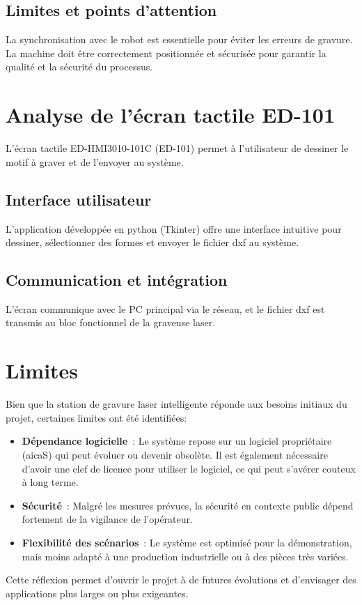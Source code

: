 \subsection{Limites et points d’attention}
La synchronisation avec le robot est essentielle pour éviter les erreurs de gravure. La machine doit être correctement positionnée et sécurisée pour garantir la qualité et la sécurité du processus.

\section{Analyse de l’écran tactile ED-101}
L’écran tactile ED-HMI3010-101C (ED-101) permet à l’utilisateur de dessiner le motif à graver et de l'envoyer au système.
\subsection{Interface utilisateur}
L’application développée en \gls{python} (Tkinter) offre une interface intuitive pour dessiner, sélectionner des formes et envoyer le fichier \gls{dxf} au système.
\subsection{Communication et intégration}
L’écran communique avec le PC principal via le réseau, et le fichier \gls{dxf} est transmis au bloc fonctionnel de la graveuse laser.


\section{Limites}
Bien que la station de gravure laser intelligente réponde aux besoins initiaux du projet, certaines limites ont été identifiées:
\begin{itemize}
    \item \textbf{Dépendance logicielle} : Le système repose sur un logiciel propriétaire (\gls{aicaS}) qui peut évoluer ou devenir obsolète. Il est également nécessaire d'avoir une clef de licence pour utiliser le logiciel, ce qui peut s'avérer couteux à long terme.
    \item \textbf{Sécurité} : Malgré les mesures prévues, la sécurité en contexte public dépend fortement de la vigilance de l'opérateur.
    \item \textbf{Flexibilité des scénarios} : Le système est optimisé pour la démonstration, mais moins adapté à une production industrielle ou à des pièces très variées.
\end{itemize}

Cette réflexion permet d'ouvrir le projet à de futures évolutions et d'envisager des applications plus larges ou plus exigeantes.




